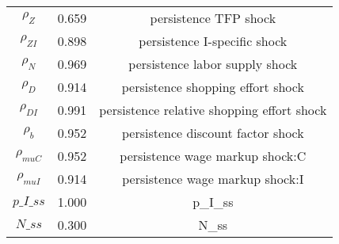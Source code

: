 \begin{center}
\begin{longtable}{ccc}
${\rho_Z}$ 	 & 	 0.659 	 & 	 persistence TFP shock\\
${\rho_{ZI}}$ 	 & 	 0.898 	 & 	 persistence I-specific shock\\
${\rho_N}$ 	 & 	 0.969 	 & 	 persistence labor supply shock\\
${\rho_D}$ 	 & 	 0.914 	 & 	 persistence shopping effort shock\\
${\rho_{DI}}$ 	 & 	 0.991 	 & 	 persistence relative shopping effort shock\\
${\rho_b}$ 	 & 	 0.952 	 & 	 persistence discount factor shock\\
${\rho_{muC}}$ 	 & 	 0.952 	 & 	 persistence wage markup shock:C\\
${\rho_{muI}}$ 	 & 	 0.914 	 & 	 persistence wage markup shock:I\\
$p\_I\_ss$ 	 & 	 1.000 	 & 	 p\_I\_ss\\
$N\_ss$ 	 & 	 0.300 	 & 	 N\_ss\\
\bottomrule%
\end{longtable}
\end{center}
